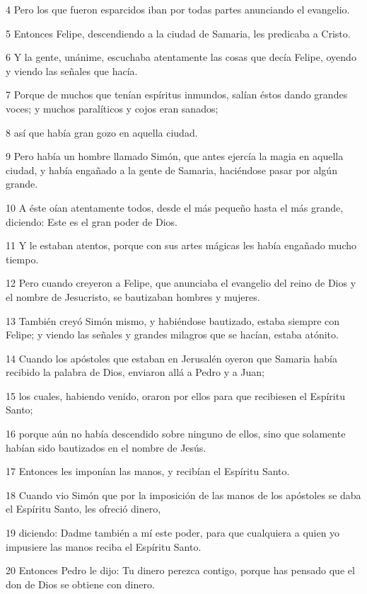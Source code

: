 \par 4 Pero los que fueron esparcidos iban por todas partes anunciando el evangelio.
\par 5 Entonces Felipe, descendiendo a la ciudad de Samaria, les predicaba a Cristo.
\par 6 Y la gente, unánime, escuchaba atentamente las cosas que decía Felipe, oyendo y viendo las señales que hacía.
\par 7 Porque de muchos que tenían espíritus inmundos, salían éstos dando grandes voces; y muchos paralíticos y cojos eran sanados;
\par 8 así que había gran gozo en aquella ciudad.
\par 9 Pero había un hombre llamado Simón, que antes ejercía la magia en aquella ciudad, y había engañado a la gente de Samaria, haciéndose pasar por algún grande.
\par 10 A éste oían atentamente todos, desde el más pequeño hasta el más grande, diciendo: Este es el gran poder de Dios.
\par 11 Y le estaban atentos, porque con sus artes mágicas les había engañado mucho tiempo.
\par 12 Pero cuando creyeron a Felipe, que anunciaba el evangelio del reino de Dios y el nombre de Jesucristo, se bautizaban hombres y mujeres.
\par 13 También creyó Simón mismo, y habiéndose bautizado, estaba siempre con Felipe; y viendo las señales y grandes milagros que se hacían, estaba atónito.
\par 14 Cuando los apóstoles que estaban en Jerusalén oyeron que Samaria había recibido la palabra de Dios, enviaron allá a Pedro y a Juan;
\par 15 los cuales, habiendo venido, oraron por ellos para que recibiesen el Espíritu Santo;
\par 16 porque aún no había descendido sobre ninguno de ellos, sino que solamente habían sido bautizados en el nombre de Jesús.
\par 17 Entonces les imponían las manos, y recibían el Espíritu Santo.
\par 18 Cuando vio Simón que por la imposición de las manos de los apóstoles se daba el Espíritu Santo, les ofreció dinero,
\par 19 diciendo: Dadme también a mí este poder, para que cualquiera a quien yo impusiere las manos reciba el Espíritu Santo.
\par 20 Entonces Pedro le dijo: Tu dinero perezca contigo, porque has pensado que el don de Dios se obtiene con dinero.
